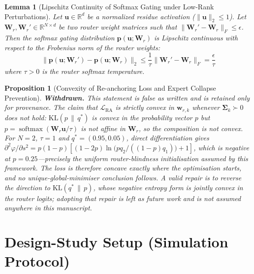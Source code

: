 \documentclass{article}
\newtheorem{lemma}[theorem]{Lemma}
\newtheorem{proposition}[theorem]{Proposition}
\theoremstyle{definition}
\begin{document}
\begin{lemma}[Lipschitz Continuity of Softmax Gating under Low-Rank Perturbations]
\label{lem:lipschitz}
Let $\mathbf{u} \in \mathbb{R}^d$ be a normalized residue activation ($\|\mathbf{u}\|_2 \le 1$). Let $\mathbf{W}_r, \mathbf{W}_r' \in \mathbb{R}^{N \times d}$ be two router weight matrices such that $\|\mathbf{W}_r' - \mathbf{W}_r\|_F \le \epsilon$. Then the softmax gating distribution $\mathbf{p}(\mathbf{u}; \mathbf{W}_r)$ is Lipschitz continuous with respect to the Frobenius norm of the router weights:
\begin{equation}
\|\mathbf{p}(\mathbf{u}; \mathbf{W}_r') - \mathbf{p}(\mathbf{u}; \mathbf{W}_r)\|_2 \le \frac{1}{\tau} \|\mathbf{W}_r' - \mathbf{W}_r\|_F = \frac{\epsilon}{\tau}
\end{equation}
where $\tau > 0$ is the router softmax temperature.
\end{lemma}

\begin{proposition}[Convexity of Re-anchoring Loss and Expert Collapse Prevention]
\label{prop:convexity}
\textbf{Withdrawn.} This statement is false as written and is retained only for provenance. The claim that $\mathcal{L}_{\text{RA}}$ is strictly convex in $\mathbf{w}_{r,k}$ whenever $\mathbf{\Sigma}_k \succ 0$ does not hold: $\mathrm{KL}(p \,\|\, q^{*})$ is convex in the \emph{probability vector} $p$ but $p = \operatorname{softmax}(\mathbf{W}_r\mathbf{u}/\tau)$ is not affine in $\mathbf{W}_r$, so the composition is not convex. For $N=2$, $\tau=1$ and $q^{*}=(0.95, 0.05)$, direct differentiation gives $\partial^{2}\varphi/\partial s^{2} = p(1-p)\left[(1-2p)\ln\!\big(pq_2/((1-p)q_1)\big) + 1\right]$, which is negative at $p = 0.25$---precisely the uniform router-blindness initialisation assumed by this framework. The loss is therefore concave exactly where the optimisation starts, and no unique-global-minimiser conclusion follows. A valid repair is to reverse the direction to $\mathrm{KL}(q^{*}\,\|\,p)$, whose negative entropy form \emph{is} jointly convex in the router logits; adopting that repair is left as future work and is not assumed anywhere in this manuscript.
\end{proposition}

\section{Design-Study Setup (Simulation Protocol)}
\label{sec:experiments}
\end{document}

